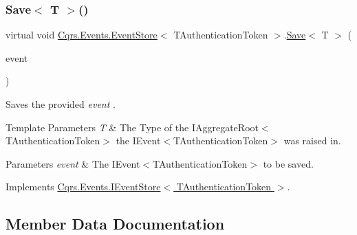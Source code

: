 \subsubsection{\texorpdfstring{Save$<$ T $>$()}{Save< T >()}}
{\footnotesize\ttfamily virtual void \hyperlink{classCqrs_1_1Events_1_1EventStore}{Cqrs.\+Events.\+Event\+Store}$<$ T\+Authentication\+Token $>$.\hyperlink{classCqrs_1_1Events_1_1EventStore_a3ba5ba04a36382b6d36a6ad8867dc766_a3ba5ba04a36382b6d36a6ad8867dc766}{Save}$<$ T $>$ (\begin{DoxyParamCaption}\item[{\hyperlink{interfaceCqrs_1_1Events_1_1IEvent}{I\+Event}$<$ T\+Authentication\+Token $>$ @}]{event }\end{DoxyParamCaption})\hspace{0.3cm}{\ttfamily [virtual]}}



Saves the provided {\itshape event} . 


\begin{DoxyTemplParams}{Template Parameters}
{\em T} & The Type of the I\+Aggregate\+Root$<$\+T\+Authentication\+Token$>$ the I\+Event$<$\+T\+Authentication\+Token$>$ was raised in.\\
\hline
\end{DoxyTemplParams}

\begin{DoxyParams}{Parameters}
{\em event} & The I\+Event$<$\+T\+Authentication\+Token$>$ to be saved.\\
\hline
\end{DoxyParams}


Implements \hyperlink{interfaceCqrs_1_1Events_1_1IEventStore_a92e768243d6602d09b786bbd06811ce6_a92e768243d6602d09b786bbd06811ce6}{Cqrs.\+Events.\+I\+Event\+Store$<$ T\+Authentication\+Token $>$}.



\subsection{Member Data Documentation}
\mbox{\label{classCqrs_1_1Events_1_1EventStore_a1e6d87995d38d6fbb148388ec165a87e_a1e6d87995d38d6fbb148388ec165a87e}} 
